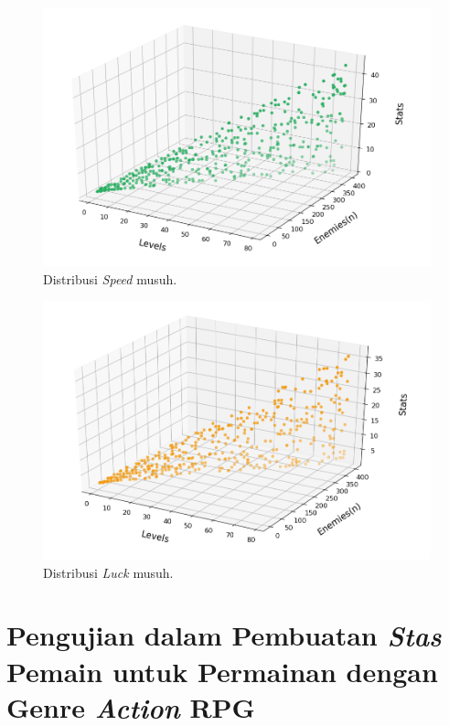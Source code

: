 \begin{figure} [!h] \centering
	\includegraphics[scale=0.58]{img/EnemySpeedDistrib.png}
	\caption{Distribusi \textit{Speed} musuh.}
	\label{fig:enemy_spd_distrib}
	\vspace{2ex}
\end{figure}

\begin{figure} [!h] \centering
	\includegraphics[scale=0.58]{img/EnemyLuckDistrib.png}
	\caption{Distribusi \textit{Luck} musuh.}
	\label{fig:enemy_luck_distrib}
\end{figure}
\vspace{1ex}

\section{Pengujian dalam Pembuatan \textit{Stas} Pemain untuk Permainan dengan Genre \textit{Action} RPG}
\label{sec:sec4_eval_action_player}
\vspace{1ex}

